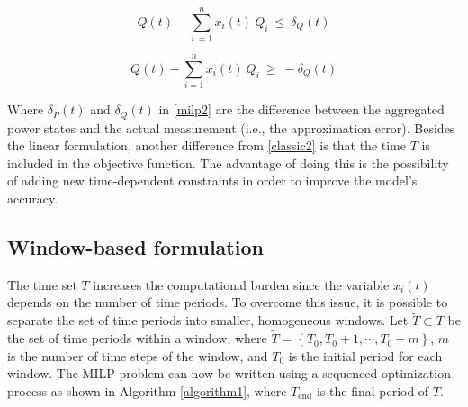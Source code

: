 \begin{equation} 
   Q(t) - \sum_{i\ = 1}^{n} x_i(t)\ Q_i \ \leq \ \delta_Q(t)
\end{equation}

\begin{equation} \label{eq7}
  Q(t) - \sum_{i = 1}^{n} x_i(t)\ Q_i \ \geq \ -\delta_Q(t)
\end{equation}

Where $\delta_P(t)$ and $\delta_Q(t)$ in \eqref{milp2} are the difference between the aggregated power states and the actual measurement (i.e., the approximation error). Besides the linear formulation, another difference from \eqref{classic2} is that the time $T$ is included in the objective function. The advantage of doing this is the possibility of adding new time-dependent constraints in order to improve the model's accuracy. 

\subsection{Window-based formulation}
The time set $T$ increases the computational burden since the variable $x_i(t)$ depends on the number of time periods. To overcome this issue, it is possible to separate the set of time periods into smaller, homogeneous windows. Let $\tilde{T} \subset T$ be the set of time periods within a window, where $\tilde{T} = \left\{ T_{0} , T_{0} + 1, \cdots , T_{0} + m \right\}$, $m$ is the number of time steps of the window, and $T_{0}$ is the initial period for each window. The MILP problem can now be written using a sequenced  optimization process as shown in Algorithm \ref{algorithm1}, where $T_{\text{end}}$ is the final period of $T$.

